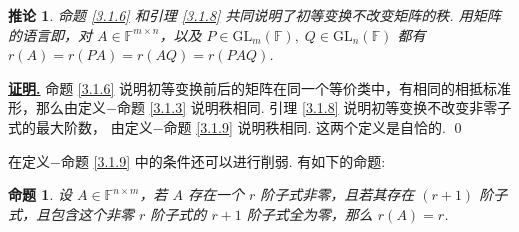 \documentclass[10pt,openany]{article}
\theoremstyle{thmstyle} %
\theoremstyle{defstyle} %
\newtheorem{corollary}[theorem]{推论}
\theoremstyle{prostyle} %
\newtheorem{proposition}[theorem]{命题}
\theoremstyle{exastyle}
\theoremstyle{remstyle}
\renewenvironment{proof}[1][证明]{\par\underline{\textbf{#1.}} \;\fangsong}{\qed\par}
\newcommand{\F}{\mathbb{F}}
\newcommand{\gfn}{\text{GL}_n(\mathbb{F})}
\newcommand{\gfm}{\text{GL}_m(\mathbb{F})}
\newcommand{\mn}{^{m \times n}}
\newcommand{\nm}{^{n \times m}}
\begin{document}
\begin{corollary} \label{3.1.10}
	命题 \ref{3.1.6} 和引理 \ref{3.1.8} 共同说明了初等变换不改变矩阵的秩. 用矩阵的语言即，对 \( A \in \F\mn \)，以及 \( P \in \gfm, \; Q \in \gfn \) 都有 \( r(A)=r(PA)=r(AQ)=r(PAQ) \).
\end{corollary}

\begin{proof}
	命题 \ref{3.1.6} 说明初等变换前后的矩阵在同一个等价类中，有相同的相抵标准形，那么由定义\(-\)命题 \ref{3.1.3} 说明秩相同. 引理 \ref{3.1.8} 说明初等变换不改变非零子式的最大阶数， 由定义\(-\)命题 \ref{3.1.9} 说明秩相同. 这两个定义是自恰的.
\end{proof}

在定义\(-\)命题 \ref{3.1.9} 中的条件还可以进行削弱. 有如下的命题:

\begin{proposition} \label{3.1.11}
	设 \( A \in \F\nm \)，若 \( A \) 存在一个 \( r \) 阶子式非零，且若其存在 \( (r+1) \) 阶子式，且包含这个非零 \( r \) 阶子式的 \( r+1 \) 阶子式全为零，那么 \( r(A)=r \).
\end{proposition}
\end{document}
